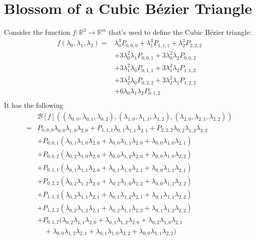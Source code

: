 
\section{Blossom of a Cubic Bézier Triangle}
Consider the function $f:\mathbb{R}^3\rightarrow\mathbb{R}^m$ that's used to define the  Cubic Bézier triangle:
\[\begin{aligned}
	f(\lambda_0,\lambda_1,\lambda_2) =& \lambda_0^3P_{0,0,0}+\lambda_1^3P_{1,1,1}+\lambda_2^3P_{2,2,2}\\
	&+3\lambda_0^2\lambda_1P_{0,0,1}+3\lambda_0^2\lambda_2P_{0,0,2}\\
	&+3\lambda_1^2\lambda_0P_{0,1,1}+3\lambda_1^2\lambda_2P_{1,1,2}\\
	&+3\lambda_2^2\lambda_0P_{0,2,2}+3\lambda_2^2\lambda_1P_{1,2,2}\\
	&+6\lambda_0\lambda_1\lambda_2P_{0,1,2}\\
\end{aligned}\]
It has the following 
\[\begin{aligned}
	&\mathcal{B}[f]((\lambda_{0,0},\lambda_{0,1},\lambda_{0,2}),(\lambda_{1,0},\lambda_{1,1},\lambda_{1,2}),(\lambda_{2,0},\lambda_{2,1},\lambda_{2,2}))\\
	=&P_{0,0,0}\lambda_{0, 0} \lambda_{1, 0} \lambda_{2, 0}
	+P_{1,1,1} \lambda_{0, 1} \lambda_{1, 1} \lambda_{2, 1}
	+P_{2,2,2} \lambda_{0, 2} \lambda_{1, 2} \lambda_{2, 2}\\
	&+P_{0,0,1} (\lambda_{0, 1} \lambda_{1, 0} \lambda_{2, 0} + \lambda_{0, 0} \lambda_{1, 1} \lambda_{2, 0} + \lambda_{0, 0} \lambda_{1, 0} \lambda_{2, 1})\\
	&+P_{0,0,2} (\lambda_{0, 2} \lambda_{1, 0} \lambda_{2, 0} + \lambda_{0, 0} \lambda_{1, 2} \lambda_{2, 0} + \lambda_{0, 0} \lambda_{1, 0} \lambda_{2, 2})\\
	&+P_{0,1,1} (\lambda_{0, 1} \lambda_{1, 1} \lambda_{2, 0} + \lambda_{0, 1} \lambda_{1, 0} \lambda_{2, 1} + \lambda_{0, 0} \lambda_{1, 1} \lambda_{2, 1})\\
	&+P_{0,2,2} (\lambda_{0, 2} \lambda_{1, 2} \lambda_{2, 0} + \lambda_{0, 2} \lambda_{1, 0} \lambda_{2, 2} + \lambda_{0, 0} \lambda_{1, 2} \lambda_{2, 2})\\
	&+P_{1,1,2} (\lambda_{0, 2} \lambda_{1, 1} \lambda_{2, 1} + \lambda_{0, 1} \lambda_{1, 2} \lambda_{2, 1} + \lambda_{0, 1} \lambda_{1, 1} \lambda_{2, 2})\\
	&+P_{1,2,2} (\lambda_{0, 2} \lambda_{1, 2} \lambda_{2, 1} + \lambda_{0, 2} \lambda_{1, 1} \lambda_{2, 2} + \lambda_{0, 1} \lambda_{1, 2} \lambda_{2, 2})\\
	&+P_{0,1,2} (\lambda_{0, 2} \lambda_{1, 1} \lambda_{2, 0} + \lambda_{0, 1} \lambda_{1, 2} \lambda_{2, 0} + \lambda_{0, 2} \lambda_{1, 0} \lambda_{2, 1}\\
	&\quad+ \lambda_{0, 0} \lambda_{1, 2} \lambda_{2, 1} + \lambda_{0, 1} \lambda_{1, 0} \lambda_{2, 2} + \lambda_{0, 0} \lambda_{1, 1} \lambda_{2, 2})\\
\end{aligned}\]

